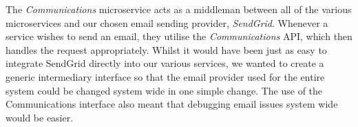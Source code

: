 The \textit{Communications} microservice acts as a middleman between all of the various microservices and our chosen email sending provider, \textit{SendGrid}. Whenever a service wishes to send an email, they utilise the \textit{Communications} API, which then handles the request appropriately. Whilst it would have been just as easy to integrate SendGrid directly into our various services, we wanted to create a generic intermediary interface so that the email provider used for the entire system could be changed system wide in one simple change. The use of the Communications interface also meant that debugging email issues system wide would be easier. 